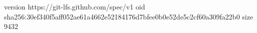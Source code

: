 version https://git-lfs.github.com/spec/v1
oid sha256:30ef340f5aff052ae61a4662e52184176d7bfee0b0e52de5c2cf60a309fa22b0
size 9432
